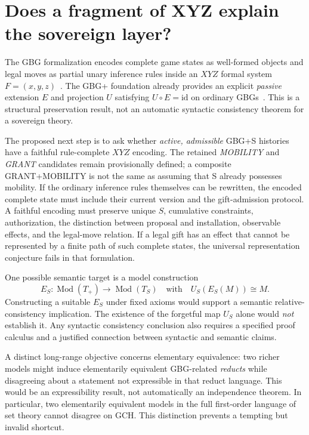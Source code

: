 \documentclass[11pt,letterpaper]{article}
\theoremstyle{remark}
\begin{document}
\section{Does a fragment of XYZ explain the sovereign layer?}
The GBG formalization encodes complete game states as well-formed objects and legal moves as partial unary inference rules inside an $XYZ$ formal system $F=(x,y,z)$~\cite{GBG,GBGp}. The GBG+ foundation already provides an explicit \emph{passive} extension $E$ and projection $U$ satisfying $U\circ E=\mathrm{id}$ on ordinary GBGs~\cite{GBGp}. This is a structural preservation result, not an automatic syntactic consistency theorem for a sovereign theory.

The proposed next step is to ask whether \emph{active, admissible} GBG+S histories have a faithful rule-complete $XYZ$ encoding. The retained \emph{MOBILITY} and \emph{GRANT} candidates remain provisionally defined; a composite GRANT+MOBILITY is not the same as assuming that S already possesses mobility. If the ordinary inference rules themselves can be rewritten, the encoded complete state must include their current version and the gift-admission protocol. A faithful encoding must preserve unique $S$, cumulative constraints, authorization, the distinction between proposal and installation, observable effects, and the legal-move relation. If a legal gift has an effect that cannot be represented by a finite path of such complete states, the universal representation conjecture fails in that formulation.

One possible semantic target is a model construction
\[
E_S:\operatorname{Mod}(T_+)\longrightarrow\operatorname{Mod}(T_S)
\quad\text{with}\quad
U_S(E_S(M))\cong M.
\]
Constructing a suitable $E_S$ under fixed axioms would support a semantic relative-consistency implication. The existence of the forgetful map $U_S$ alone would \emph{not} establish it. Any syntactic consistency conclusion also requires a specified proof calculus and a justified connection between syntactic and semantic claims.

A distinct long-range objective concerns elementary equivalence: two richer models might induce elementarily equivalent GBG-related \emph{reducts} while disagreeing about a statement not expressible in that reduct language. This would be an expressibility result, not automatically an independence theorem. In particular, two elementarily equivalent models in the full first-order language of set theory cannot disagree on GCH. This distinction prevents a tempting but invalid shortcut.
\end{document}
